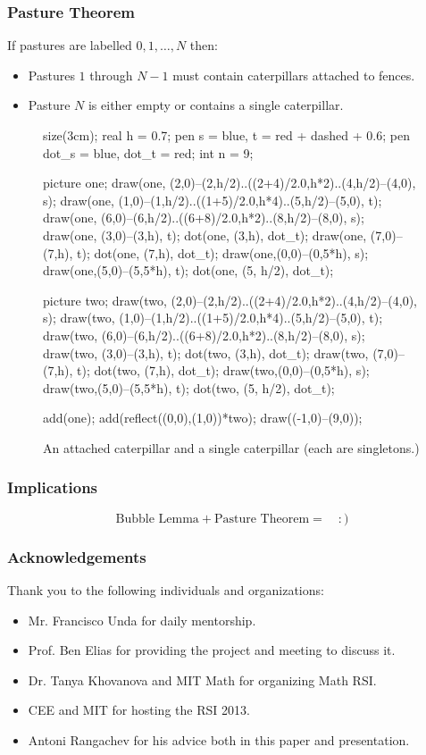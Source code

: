 \documentclass[pdf]{beamer}
\def\ii{\item}
\theoremstyle{definition}
\begin{document}
\begin{frame}[fragile]
	\frametitle{Pasture Theorem}
	\begin{theorem}
		 If pastures are labelled $0, 1, \dots, N$ then:
		\begin{itemize}
			\ii Pastures $1$ through $N-1$ must contain caterpillars attached to fences.
			\ii Pasture $N$ is either empty or contains a single caterpillar.
		\end{itemize}
	\end{theorem}
	\begin{figure}[ht]
		\centering
		\begin{asy}
			size(3cm);
real h = 0.7;
pen s = blue, t = red + dashed + 0.6;
pen dot_s = blue, dot_t = red;
int n = 9;

picture one;
draw(one, (2,0)--(2,h/2)..((2+4)/2.0,h*2)..(4,h/2)--(4,0), s);
draw(one, (1,0)--(1,h/2)..((1+5)/2.0,h*4)..(5,h/2)--(5,0), t);
draw(one, (6,0)--(6,h/2)..((6+8)/2.0,h*2)..(8,h/2)--(8,0), s);
draw(one, (3,0)--(3,h), t);
dot(one, (3,h), dot_t);
draw(one, (7,0)--(7,h), t);
dot(one, (7,h), dot_t);
draw(one,(0,0)--(0,5*h), s);
draw(one,(5,0)--(5,5*h), t);
dot(one, (5, h/2), dot_t);

picture two;
draw(two, (2,0)--(2,h/2)..((2+4)/2.0,h*2)..(4,h/2)--(4,0), s);
draw(two, (1,0)--(1,h/2)..((1+5)/2.0,h*4)..(5,h/2)--(5,0), t);
draw(two, (6,0)--(6,h/2)..((6+8)/2.0,h*2)..(8,h/2)--(8,0), s);
draw(two, (3,0)--(3,h), t);
dot(two, (3,h), dot_t);
draw(two, (7,0)--(7,h), t);
dot(two, (7,h), dot_t);
draw(two,(0,0)--(0,5*h), s);
draw(two,(5,0)--(5,5*h), t);
dot(two, (5, h/2), dot_t);

add(one); add(reflect((0,0),(1,0))*two);
draw((-1,0)--(9,0));
		\end{asy}
		\caption{An attached caterpillar and a single caterpillar (each are singletons.)}
	\end{figure}
\end{frame}

\begin{frame}
	\frametitle{Implications}
	\[ \text{Bubble Lemma} + \text{Pasture Theorem} = \quad :{)} \]
\end{frame}

\begin{frame}
	\frametitle{Acknowledgements}
	Thank you to the following individuals and organizations:
	\begin{itemize}
		\ii Mr. Francisco Unda for daily mentorship.
		\ii Prof. Ben Elias for providing the project and meeting to discuss it.
		\ii Dr. Tanya Khovanova and MIT Math for organizing Math RSI.
		\ii CEE and MIT for hosting the RSI 2013.
		\ii Antoni Rangachev for his advice both in this paper and presentation.
	\end{itemize}
\end{frame}
\end{document}
